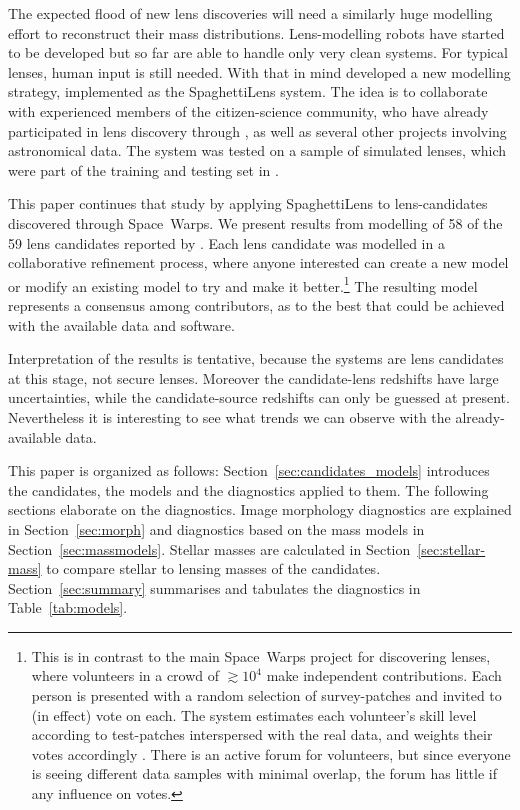 The expected flood of new lens discoveries will need a similarly huge
modelling effort to reconstruct their mass distributions.
Lens-modelling robots have started to be developed
\citep{2017arXiv170807377N,2017arXiv170808842H} but so far are able to
handle only very clean systems.  For typical lenses, human input is
still needed.  With that in mind \cite{2015MNRAS.447.2170K} developed
a new modelling strategy, implemented as the SpaghettiLens system.
The idea is to collaborate with experienced members of the
citizen-science community, who have already participated in lens
discovery through \SW, as well as several other projects involving
astronomical data.  The system was tested on a sample of simulated
lenses, which were part of the training and testing set in \SW.

This paper continues that study by applying SpaghettiLens to
lens-candidates discovered through Space~Warps.  We present results
from modelling of 58 of the 59 lens candidates reported by
\cite{2016MNRAS.455.1191M}.  Each lens candidate was modelled in a
collaborative refinement process, where anyone interested can create a
new model or modify an existing model to try and make it
better.\footnote{This is in contrast to the main Space~Warps project
  for discovering lenses, where volunteers in a crowd of $\gtrsim10^4$
  make independent contributions.  Each person is presented with a
  random selection of survey-patches and invited to (in effect) vote
  on each.  The system estimates each volunteer's skill level
  according to test-patches interspersed with the real data, and
  weights their votes accordingly \citep{2016MNRAS.455.1171M}.  There
  is an active forum for volunteers, but since everyone is seeing
  different data samples with minimal overlap, the forum has little if
  any influence on votes.}  The resulting model represents a consensus
among contributors, as to the best that could be achieved with the
available data and software.

Interpretation of the results is tentative,
because the systems are lens candidates at this stage, not secure lenses.
Moreover the candidate-lens redshifts have large uncertainties, while
the candidate-source redshifts can only be guessed at present.
Nevertheless it is interesting to see what trends we can observe with
the already-available data.

This paper is organized as follows:
Section~\ref{sec:candidates_models} introduces the candidates, the models and the diagnostics applied to them.
The following sections elaborate on the diagnostics.
Image morphology diagnostics are explained in Section~\ref{sec:morph} and
diagnostics based on the mass models in Section~\ref{sec:massmodels}.
Stellar masses are calculated in Section~\ref{sec:stellar-mass} to compare stellar to lensing masses of the candidates.
Section~\ref{sec:summary} summarises and tabulates the diagnostics in
Table~\ref{tab:models}.

